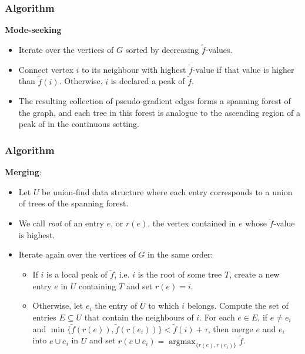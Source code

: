 \documentclass{beamer}
\theoremstyle{definition}
\DeclareMathOperator{\argmax}{argmax}
\begin{document}
\begin{frame}
\frametitle{Algorithm}
\textbf{Mode-seeking}

\begin{itemize}
\item<2-> Iterate over the vertices of $G$ sorted by decreasing $\tilde{f}$-values.
\item<3-> Connect vertex $i$ to its neighbour with highest $\tilde{f}$-value if that value is higher than $\tilde{f}(i)$. Otherwise, $i$ is declared a peak of $\tilde{f}$. %
\end{itemize}  
\begin{itemize}
\item<4->[] The resulting collection of
pseudo-gradient edges forms a spanning forest of the graph, and each tree in this
forest is analogue to the ascending region of a peak of in the continuous setting.
\end{itemize}
\end{frame}
\begin{frame}
\frametitle{Algorithm}
\textbf{Merging}:
\begin{itemize}
\item<2-> Let $U$ be union-find data structure where each entry corresponds to a union of trees of the spanning forest.
\item<3-> We call \emph{root} of an entry $e$, or $r(e)$, the vertex contained in $e$ whose $\tilde{f}$-value is highest.
\item<4-> Iterate again over the vertices of $G$ in the same order: 
\begin{itemize}
\item<5-> If $i$ is a local peak of $\tilde{f}$, i.e. $i$ is the root of some tree $T$, create a new entry $e$ in $U$ containing $T$ and set $r(e)=i$.%
\item<6-> Otherwise, let $e_i$ the entry of $U$ to which $i$ belongs. Compute the set of entries $E\subseteq U$ that contain the neighbours of $i$. For each $e\in E$, if $e\neq e_i$ and $\min\{\tilde{f}(r(e)),\tilde{f}(r(e_i))\}<\tilde{f}(i)+\tau$, then merge $e$ and $e_i$ into $e\cup e_i$ in $U$ and set $r(e\cup e_i)=\argmax_{\{r(e),r(e_i)\}}\tilde{f}$. %
\end{itemize}
\end{itemize}
\end{frame}
\end{document}
